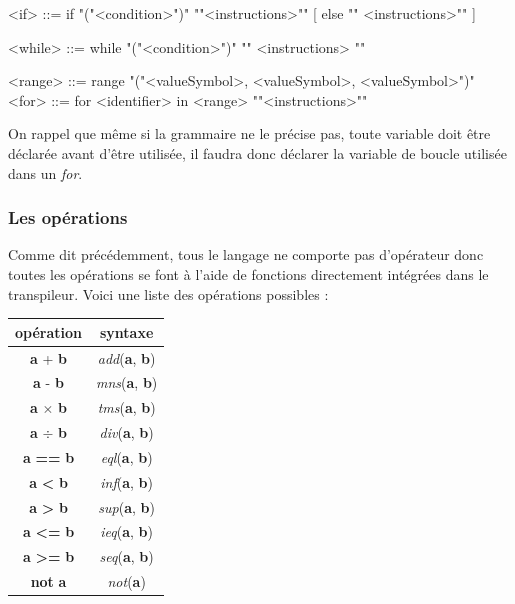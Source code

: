 \documentclass[a4paper]{article}%
\begin{document}
\begin{grammar}
<if> ::= if "("<condition>")" "{"<instructions>"}" [ else "{" <instructions>"}" ]

<while> ::= while "("<condition>")" "{" <instructions> "}"

<range> ::= range "("<valueSymbol>, <valueSymbol>, <valueSymbol>")"
<for> ::= for <identifier> in <range> "{"<instructions>"}"
\end{grammar}\leavevmode\newline

On rappel que même si la grammaire ne le précise pas, toute variable doit être
déclarée avant d'être utilisée, il faudra donc déclarer la variable de boucle
utilisée dans un \textit{for}.

\subsubsection*{Les opérations}
\label{sec:operator}

Comme dit précédemment, tous le langage ne comporte pas d'opérateur donc toutes
les opérations se font à l'aide de fonctions directement intégrées dans le
transpileur. Voici une liste des opérations possibles :

\begin{center}
\begin{tabular}{ | c | c | }
    \hline
    opération & syntaxe\\
    \hline
    \textbf{a} + \textbf{b} & \textit{add}(\textbf{a}, \textbf{b})\\
    \hline
    \textbf{a} - \textbf{b} & \textit{mns}(\textbf{a}, \textbf{b})\\
    \hline
    \textbf{a} $\times$ \textbf{b} & \textit{tms}(\textbf{a}, \textbf{b})\\
    \hline
    \textbf{a} $\div$ \textbf{b} & \textit{div}(\textbf{a}, \textbf{b})\\
    \hline
    \textbf{a} \textbf{==} \textbf{b} & \textit{eql}(\textbf{a}, \textbf{b})\\
    \hline
    \textbf{a} \textbf{<} \textbf{b} & \textit{inf}(\textbf{a}, \textbf{b})\\
    \hline
    \textbf{a} \textbf{>} \textbf{b} & \textit{sup}(\textbf{a}, \textbf{b})\\
    \hline
    \textbf{a} \textbf{<=} \textbf{b} & \textit{ieq}(\textbf{a}, \textbf{b})\\
    \hline
    \textbf{a} \textbf{>=} \textbf{b} & \textit{seq}(\textbf{a}, \textbf{b})\\
    \hline
    \textbf{not} \textbf{a} & \textit{not}(\textbf{a})\\
    \hline
\end{tabular}
\end{center}
\end{document}
